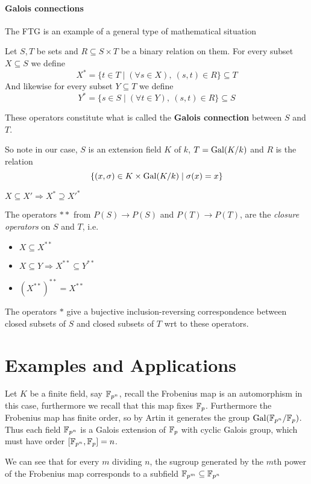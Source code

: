   \paragraph*{Galois connections}

  \begin{bergman}
    The FTG is an example of a general type of mathematical situation
    \begin{definition}
      Let $S,T$ be sets and $R\subseteq S\times T$ be a binary relation on them. For every subset $X\subseteq S$ we define \[
        X^\ast = \{t\in T\mid (\forall s\in X), \ (s,t)\in R\}\subseteq T  
      \]
      And likewise for every subset $Y\subseteq T$ we define\[
        Y^\ast = \{s\in S\mid (\forall t\in Y), \ (s,t)\in R\}\subseteq S  
      \] 

      These operators constitute what is called the \textbf{Galois connection} between $S$ and $T$.
    \end{definition}
    So note in our case, $S$ is an extension field $K$ of $k$, $T = \text{Gal}(K/k)$ and $R$ is the relation \[\{(x,\sigma)\in K\times \text{Gal}(K/k)\mid \sigma(x) = x \}\]
  
  \begin{Properties}
    \item $X\subseteq X' \Rightarrow X^\ast \supseteq X'^\ast$
    \item The operators $\ast\ast$ from $P(S)\rightarrow P(S)$ and  $P(T)\rightarrow P(T)$, are the \textit{closure operators} on $S$ and $T$, i.e.\begin{itemize}
      \item $X\subseteq X^{\ast\ast}$
      \item $X\subseteq Y\Rightarrow X^{\ast\ast}\subseteq Y^{\ast\ast}$
      \item ${(X^{\ast\ast})}^{\ast\ast} = X^{\ast\ast}$
    \end{itemize}
    \item The operators $\ast$ give a bujective inclusion-reversing correspondence between closed subsets of $S$ and closed subsets of $T$ wrt to these operators.
  \end{Properties}
  \end{bergman}

  \section{Examples and Applications}
  \begin{bergman}
    Let $K$ be a finite field, say $\mathbb{F}_{p^n}$, recall the Frobenius map is an automorphism in this case, furthermore we recall that this map fixes $\mathbb{F}_p$. Furthermore the Frobenius map has finite order, so by Artin
    it generates the group $\text{Gal}(\mathbb{F}_{p^n}/\mathbb{F}_{p})$. Thus each field $\mathbb{F}_{p^n}$ is a Galois extension of $\mathbb{F}_{p}$ with cyclic Galois group, which must have order $[\mathbb{F}_{p^n}, \mathbb{F}_{p}] = n$.

    We can see that for every $m$ dividing $n$, the sugroup generated by the $m$th power of the Frobenius map corresponds to a subfield $\mathbb{F}_{p^m}\subseteq \mathbb{F}_{p^n}$ 
  \end{bergman}
  

